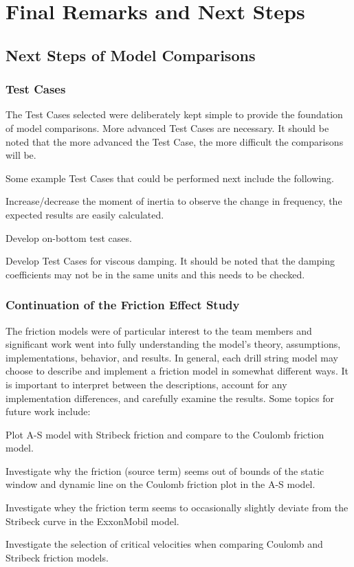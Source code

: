 \chapter{Final Remarks and Next Steps}
\section{Next Steps of Model Comparisons}
\subsection{Test Cases}
The Test Cases selected were deliberately kept simple to provide the foundation of model comparisons.  More advanced Test Cases are necessary.  It should be noted that the more advanced the Test Case, the more difficult the comparisons will be.

Some example Test Cases that could be performed next include the following.
\begin{bulletedlist}
	\item Increase/decrease the moment of inertia to observe the change in frequency, the expected results are easily calculated.
	\item Develop on-bottom test cases.
    \item Develop Test Cases for viscous damping.  It should be noted that the damping coefficients may not be in the same units and this needs to be checked.
\end{bulletedlist}

\subsection{Continuation of the Friction Effect Study}
The friction models were of particular interest to the team members and significant work went into fully understanding the model's theory, assumptions, implementations, behavior, and results.  In general, each drill string model may choose to describe and implement a friction model in somewhat different ways.  It is important to interpret between the descriptions, account for any implementation differences, and carefully examine the results.  Some topics for future work include:
\begin{bulletedlist}
	\item Plot A-S model with Stribeck friction and compare to the Coulomb friction model.
	\item Investigate why the friction (source term) seems out of bounds of the static window and dynamic line on the Coulomb friction plot in the A-S model.
	\item Investigate whey the friction term seems to occasionally slightly deviate from the Stribeck curve in the ExxonMobil model.
	\item Investigate the selection of critical velocities when comparing Coulomb and Stribeck friction models.
\end{bulletedlist}

